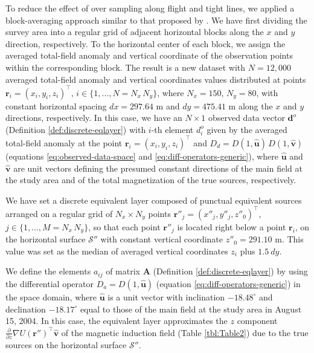 \documentclass[manuscript,noblind]{geophysics}
\begin{document}
	To reduce the effect of over sampling along flight and tight lines, we applied a 
	block-averaging approach similar to that proposed by \citet{soler_uieda2021}. 
	We have first dividing the survey area into a regular grid of adjacent 
	horizontal blocks along the $x$ and $y$ direction, respectively. 
	To the horizontal center of each block, we assign the averaged total-field anomaly and
	vertical coordinate of the observation points within the corresponding block.
	The result is a new dataset with $N = 12,000$ averaged total-field anomaly and vertical 
	coordinates values distributed at points $\mathbf{r}_{i} = (x_{i}, y_{i}, z_{i})^{\top}$, 
	$i \in \{1, \dots, N = N_{x} \, N_{y}\}$, where $N_{x} = 150$, $N_{y} = 80$, with constant  
	horizontal spacing $dx = 297.64$ m and $dy = 475.41$ m along the $x$ and $y$ directions, 
	respectively. 
	In this case, we have an $N \times 1$ observed data vector $\mathbf{d}^{o}$ 
	(Definition \ref{def:discrete-eqlayer}) with $i$-th element $d^{o}_{i}$ given by the 
	averaged total-field anomaly at the point $\mathbf{r}_{i} = (x_{i}, y_{i}, z_{i})^{\top}$ 
	and $D_{d} = D(1, \hat{\mathbf{u}})\, D(1, \hat{\mathbf{v}})$ 
	(equations \ref{eq:observed-data-space} and \ref{eq:diff-operators-generic}), where 
	$\hat{\mathbf{u}}$ and $\hat{\mathbf{v}}$ are unit vectors defining the presumed constant 
	directions of the main field at the study area and of the total magnetization of the true 
	sources, respectively.
	
	We have set a discrete equivalent layer composed of punctual equivalent sources arranged on 
	a regular grid of $N_{x} \times N_{y}$ points 
	$\mathbf{r}''_{j} = (x''_{j}, y''_{j}, z''_{0})^{\top}$, $j \in \{1, \dots, M = N_{x} \, N_{y}\}$, 
	so that each point $\mathbf{r}''_{j}$ is located right below a point  
	$\mathbf{r}_{i}$, on the horizontal surface $\mathcal{S}''$ with constant vertical coordinate 
	$z''_{0} = 291.10$ m. This value was set as the median of averaged vertical coordinates $z_{i}$
	plus $1.5 \: dy$. 
	
	We define the elements $a_{ij}$ of matrix $\mathbf{A}$ (Definition \ref{def:discrete-eqlayer}) 
	by using the differential operator $D_{a} = D(1, \hat{\mathbf{u}})$ 
	(equation \ref{eq:diff-operators-generic}) in the space domain, where $\hat{\mathbf{u}}$ is 
	a unit vector with inclination $-18.48^{\circ}$ and declination $-18.17^{\circ}$ equal to 
	those of the main field at the study area in August 15, 2004. 
	In this case, the equivalent layer approximates the 
	$z$ component  $\frac{\partial}{\partial z}\nabla U(\mathbf{r}'')^{\top} \hat{\mathbf{v}}$
	of the magnetic induction field (Table \ref{tbl:Table2}) due to the true sources on the 
	horizontal surface $\mathcal{S}''$.
	
\end{document}
